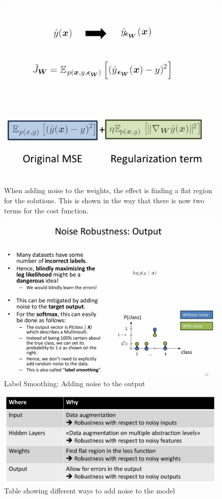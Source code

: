 \documentclass[../Main.tex]{subfiles}
\begin{document}
\begin{figure}[H]
    \centering
    \includegraphics[width=0.75\linewidth]{Images/deepl/adding-noise.png}
    \caption{When adding noise to the weights, the effect is finding a flat region for the solutions.
    This is shown in the way that there is now two terms for the cost function.}
\end{figure}


\begin{figure}[H]
    \centering
    \includegraphics[width=0.75\linewidth]{Images/deepl/label-smoothing.png}
    \caption{Label Smoothing: Adding noise to the output}
\end{figure}


\begin{figure}[H]
    \centering
    \includegraphics[width=0.75\linewidth]{Images/deepl/robustness-noise.png}
    \caption{Table showing different ways to add noise to the model}
\end{figure}
\end{document}
